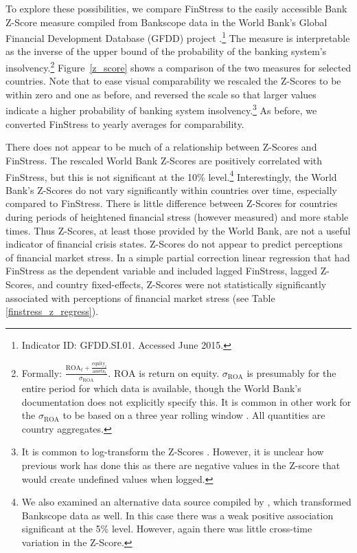 \documentclass[]{article}
\begin{document}
To explore these possibilities, we compare FinStress to the easily accessible Bank Z-Score measure compiled from Bankscope data in the World Bank's Global Financial Development Database (GFDD) project \citep{worldbank2013}.\footnote{Indicator ID: GFDD.SI.01. Accessed June 2015.} The measure is interpretable as the inverse of the upper bound of the probability of the banking system's insolvency.\footnote{Formally: $\frac{\mathrm{ROA}_{t} + \frac{\mathrm{equity}_{t}}{\mathrm{assets}_{t}}}{\sigma_{\mathrm{ROA}}}$. $\mathrm{ROA}$ is return on equity. $\sigma_{\mathrm{ROA}}$ is presumably for the entire period for which data is available, though the World Bank's documentation does not explicitly specify this. It is common in other work for the $\sigma_{\mathrm{ROA}}$ to be based on a three year rolling window \cite[225]{beck2013bank}. All quantities are country aggregates.} Figure~\ref{z_score} shows a comparison of the two measures for selected countries. Note that to ease visual comparability we rescaled the Z-Scores to be within zero and one as before, and reversed the scale so that larger values indicate a higher probability of banking system insolvency.\footnote{It is common to log-transform the Z-Scores \cite[225]{beck2013bank}. However, it is unclear how previous work has done this as there are negative values in the Z-score that would create undefined values when logged.} As before, we converted FinStress to yearly averages for comparability.

There does not appear to be much of a relationship between Z-Scores and FinStress. The rescaled World Bank Z-Scores are positively correlated with FinStress, but this is not significant at the 10\% level.\footnote{We also examined an alternative data source compiled by \cite{Andrianova2015}, which transformed Bankscope data as well. In this case there was a weak positive association significant at the 5\% level. However, again there was little cross-time variation in the Z-Score.} Interestingly, the World Bank's Z-Scores do not vary significantly within countries over time, especially compared to  FinStress. There is little difference between Z-Scores for countries during periods of heightened financial stress (however measured) and more stable times. Thus Z-Scores, at least those provided by the World Bank, are not a useful indicator of financial crisis states. Z-Scores do not appear to predict perceptions of financial market stress. In a simple partial correction linear regression that had FinStress as the dependent variable and included lagged FinStress, lagged Z-Scores, and country fixed-effects, Z-Scores were not statistically significantly associated with perceptions of financial market stress (see Table \ref{finstress_z_regress}).
\end{document}
